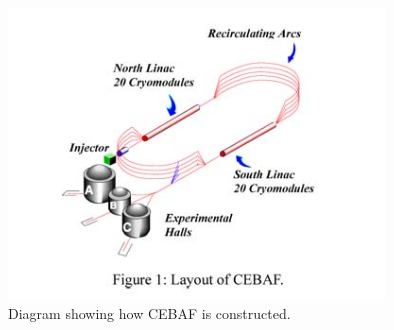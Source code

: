 \begin{figure}
  \centering
  \includegraphics[width=10cm]{image/CEBAF.jpg}
  \caption{ Diagram showing how CEBAF is constructed.  }
  \label{fig:jlab}
\end{figure}


